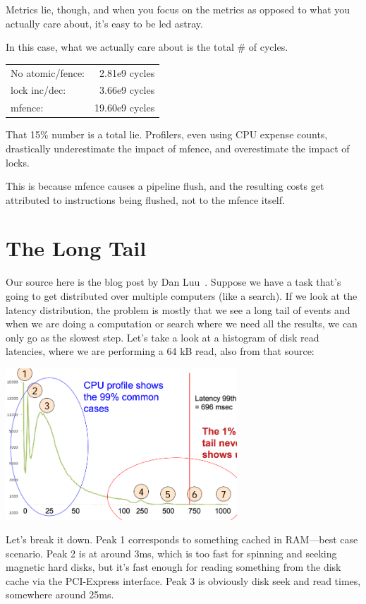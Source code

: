 \documentclass[a4paper]{report}
\begin{document}
Metrics lie, though, and when you focus on the metrics as opposed to what you
actually care about, it's easy to be led astray.

In this case, what we actually care about is the total \# of cycles.

    \begin{tabular}{lr}
    No atomic/fence:& 2.81e9 cycles\\
    lock inc/dec: & 3.66e9 cycles\\
    mfence: & 19.60e9 cycles
    \end{tabular}

That 15\% number is a total lie.
Profilers, even using CPU expense counts, drastically underestimate the impact of mfence,
and overestimate the impact of locks.

This is because mfence causes a pipeline flush, and the resulting 
costs get attributed to instructions being flushed, not to the mfence itself.


\section*{The Long Tail}

Our source here is the blog post by Dan Luu~\cite{perf-tracing}. Suppose we have a task that's going to get distributed over multiple computers (like a search). If we look at the latency distribution, the problem is mostly that we see a long tail of events and when we are doing a computation or search where we need all the results, we can only go as the slowest step. Let's take a look at a histogram of disk read latencies, where we are performing a 64 kB read, also from that source:

\begin{center}
	\includegraphics[width=0.65\textwidth]{images/disk_tail.png}
\end{center}

Let's break it down. Peak 1 corresponds to something cached in RAM---best case scenario. Peak 2 is at around 3ms, which is too fast for spinning and seeking magnetic hard disks, but it's fast enough for reading something from the disk cache via the PCI-Express interface. Peak 3 is obviously disk seek and read times, somewhere around 25ms. 
\end{document}

